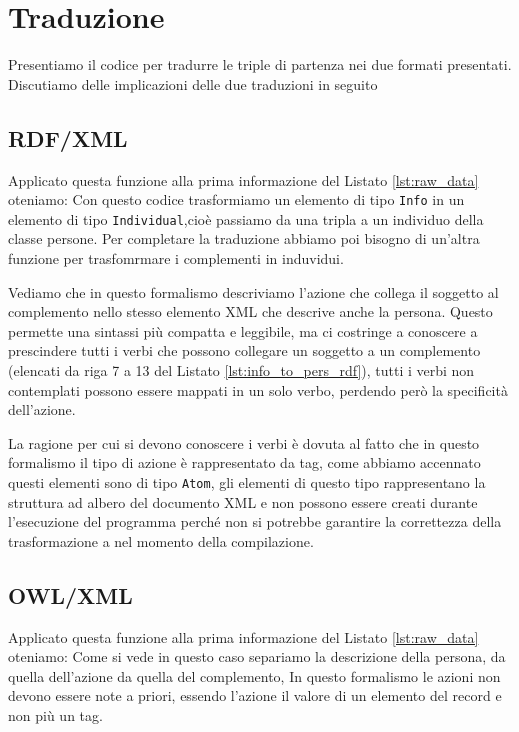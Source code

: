 \section{Traduzione}
	Presentiamo il codice per tradurre le triple di partenza nei due formati presentati. Discutiamo delle implicazioni delle due traduzioni in seguito
	\subsection{RDF/XML}
		Applicato questa funzione alla prima informazione del Listato \ref{lst:raw_data} oteniamo:
		Con questo codice trasformiamo un elemento di tipo \texttt{Info} in un elemento di tipo \texttt{Individual},cioè passiamo da una tripla a un individuo della classe persone. Per completare la traduzione abbiamo poi bisogno di un'altra funzione per trasfomrmare i complementi in induvidui.
		
		Vediamo che in questo formalismo descriviamo l'azione che collega il soggetto al complemento nello stesso elemento XML che descrive anche la persona. Questo permette una sintassi più compatta e leggibile, ma ci costringe a conoscere a prescindere tutti i verbi che possono collegare un soggetto a un complemento (elencati da riga 7 a 13 del Listato \ref{lst:info_to_pers_rdf}), tutti i verbi non contemplati possono essere mappati in un solo verbo, perdendo però la specificità dell'azione.
		
		La ragione per cui si devono conoscere i verbi è dovuta al fatto che in questo formalismo il tipo di azione è rappresentato da tag, come abbiamo accennato questi elementi sono di tipo \texttt{Atom}, gli elementi di questo tipo rappresentano la struttura ad albero del documento XML e non possono essere creati durante l'esecuzione del programma perché non si potrebbe garantire la correttezza della trasformazione a nel momento della compilazione.
	\subsection{OWL/XML}
		Applicato questa funzione alla prima informazione del Listato \ref{lst:raw_data} oteniamo:
		Come si vede in questo caso separiamo la descrizione della persona, da quella dell'azione da quella del complemento, In questo formalismo le azioni non devono essere note a priori, essendo l'azione il valore di un elemento del record e non più un tag.
		
